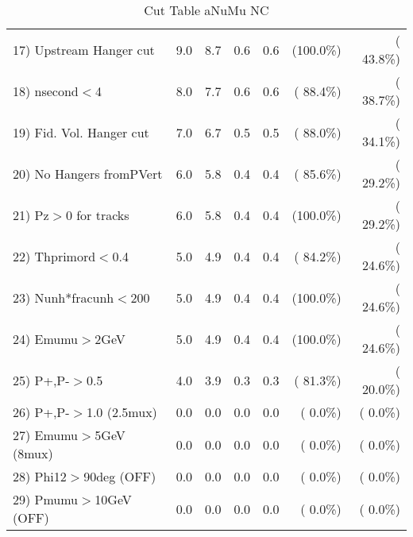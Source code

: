 \begin{table}[h!]
\begin{tabular}{||l||r|r|r|r|r|r||}
 17) Upstream Hanger cut  &          9.0 &          8.7 &          0.6 &          0.6 & (100.0\%) & ( 43.8\%) \\
 18) nsecond$<$4          &          8.0 &          7.7 &          0.6 &          0.6 & ( 88.4\%) & ( 38.7\%) \\
 19) Fid. Vol. Hanger cut &          7.0 &          6.7 &          0.5 &          0.5 & ( 88.0\%) & ( 34.1\%) \\
 20) No Hangers fromPVert &          6.0 &          5.8 &          0.4 &          0.4 & ( 85.6\%) & ( 29.2\%) \\
 21) Pz$>$0 for tracks    &          6.0 &          5.8 &          0.4 &          0.4 & (100.0\%) & ( 29.2\%) \\
 22) Thprimord$<$0.4      &          5.0 &          4.9 &          0.4 &          0.4 & ( 84.2\%) & ( 24.6\%) \\
 23) Nunh*fracunh$<$200   &          5.0 &          4.9 &          0.4 &          0.4 & (100.0\%) & ( 24.6\%) \\
 24) Emumu$>$2GeV         &          5.0 &          4.9 &          0.4 &          0.4 & (100.0\%) & ( 24.6\%) \\
 25) P+,P-$>$0.5          &          4.0 &          3.9 &          0.3 &          0.3 & ( 81.3\%) & ( 20.0\%) \\
 26) P+,P-$>$1.0 (2.5mux) &          0.0 &          0.0 &          0.0 &          0.0 & (  0.0\%) & (  0.0\%) \\
 27) Emumu$>$5GeV  (8mux) &          0.0 &          0.0 &          0.0 &          0.0 & (  0.0\%) & (  0.0\%) \\
 28) Phi12$>$90deg  (OFF) &          0.0 &          0.0 &          0.0 &          0.0 & (  0.0\%) & (  0.0\%) \\
 29) Pmumu$>$10GeV  (OFF) &          0.0 &          0.0 &          0.0 &          0.0 & (  0.0\%) & (  0.0\%) \\
 \hline
 \hline
 \end{tabular}
 \caption{Cut Table  aNuMu NC }
 \label{tab-cutcohjpsi-mumu_anumunc}
 \end{table}
